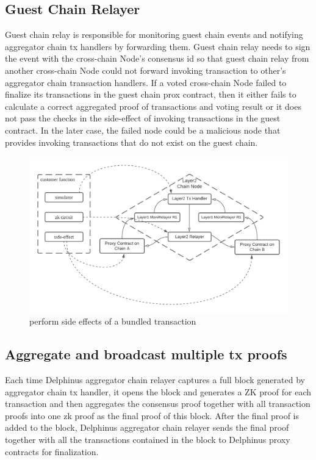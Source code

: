 \documentclass[pageno]{jpaper}
\begin{document}
\subsection{Guest Chain Relayer}
Guest chain relay is responsible for monitoring guest chain events and notifying aggregator chain tx handlers by forwarding them. Guest chain relay needs to sign the event with the cross-chain Node's consensus id so that guest chain relay from another cross-chain Node could not forward invoking transaction to other's aggregator chain transaction handlers. If a voted cross-chain Node failed to finalize its transactions in the guest chain prox contract, then it either fails to calculate a correct aggregated proof of transactions and voting result or it does not pass the checks in the side-effect of invoking transactions in the guest contract. In the later case, the failed node could be a malicious node that provides invoking transactions that do not exist on the guest chain.  

\begin{figure}[!ht]
\caption{perform side effects of a bundled transaction}
\label{sideffects}
\includegraphics[scale=0.2]{side-effects}
\end{figure}


\subsection{Aggregate and broadcast multiple tx proofs}
Each time Delphinus aggregator chain relayer captures a full block generated by aggregator chain tx handler, it opens the block and generates a ZK proof for each transaction and then aggregates the consensus proof together with all transaction proofs into one zk proof as the final proof of this block. After the final proof is added to the block, Delphinus aggregator chain relayer sends the final proof together with all the transactions contained in the block to Delphinus proxy contracts for finalization.
\end{document}
